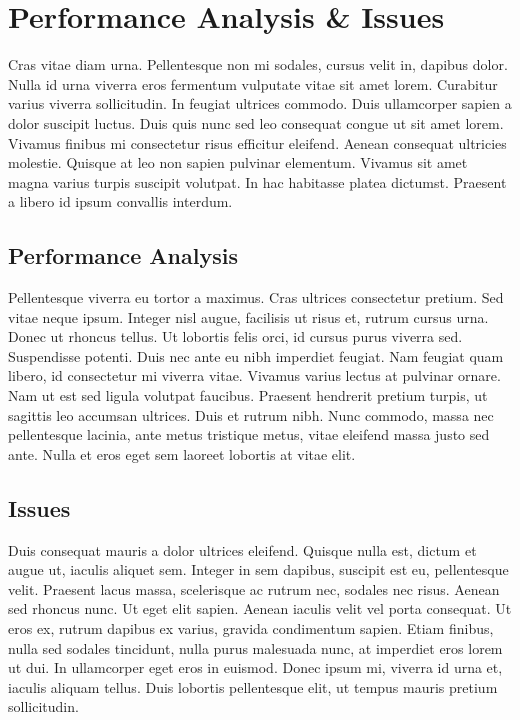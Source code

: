\chapter{Performance Analysis \& Issues}
Cras vitae diam urna. Pellentesque non mi sodales, cursus velit in, dapibus dolor. Nulla id urna viverra eros fermentum vulputate vitae sit amet lorem. Curabitur varius viverra sollicitudin. In feugiat ultrices commodo. Duis ullamcorper sapien a dolor suscipit luctus. Duis quis nunc sed leo consequat congue ut sit amet lorem. Vivamus finibus mi consectetur risus efficitur eleifend. Aenean consequat ultricies molestie. Quisque at leo non sapien pulvinar elementum. Vivamus sit amet magna varius turpis suscipit volutpat. In hac habitasse platea dictumst. Praesent a libero id ipsum convallis interdum.


\section{Performance Analysis}
Pellentesque viverra eu tortor a maximus. Cras ultrices consectetur pretium. Sed vitae neque ipsum. Integer nisl augue, facilisis ut risus et, rutrum cursus urna. Donec ut rhoncus tellus. Ut lobortis felis orci, id cursus purus viverra sed. Suspendisse potenti. Duis nec ante eu nibh imperdiet feugiat. Nam feugiat quam libero, id consectetur mi viverra vitae. Vivamus varius lectus at pulvinar ornare. Nam ut est sed ligula volutpat faucibus. Praesent hendrerit pretium turpis, ut sagittis leo accumsan ultrices. Duis et rutrum nibh. Nunc commodo, massa nec pellentesque lacinia, ante metus tristique metus, vitae eleifend massa justo sed ante. Nulla et eros eget sem laoreet lobortis at vitae elit.


\section{Issues}
Duis consequat mauris a dolor ultrices eleifend. Quisque nulla est, dictum et augue ut, iaculis aliquet sem. Integer in sem dapibus, suscipit est eu, pellentesque velit. Praesent lacus massa, scelerisque ac rutrum nec, sodales nec risus. Aenean sed rhoncus nunc. Ut eget elit sapien. Aenean iaculis velit vel porta consequat. Ut eros ex, rutrum dapibus ex varius, gravida condimentum sapien. Etiam finibus, nulla sed sodales tincidunt, nulla purus malesuada nunc, at imperdiet eros lorem ut dui. In ullamcorper eget eros in euismod. Donec ipsum mi, viverra id urna et, iaculis aliquam tellus. Duis lobortis pellentesque elit, ut tempus mauris pretium sollicitudin.
